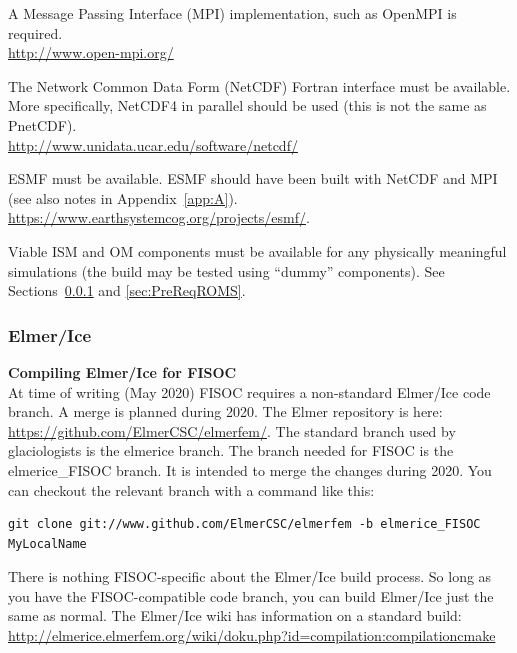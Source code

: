 \documentclass[11pt]{article}
\begin{document}
A Message Passing Interface (MPI) implementation, such as 
OpenMPI is required.\\
 \url{http://www.open-mpi.org/}

The Network Common Data Form (NetCDF) Fortran interface must be available. 
More specifically, NetCDF4 in parallel should be used (this is not the same as PnetCDF). \\
\url{http://www.unidata.ucar.edu/software/netcdf/}

ESMF must be available. ESMF should have been built with NetCDF and MPI 
(see also notes in Appendix~\ref{app:A}). \\
\url{https://www.earthsystemcog.org/projects/esmf/}.


Viable ISM and OM components must be available for any physically meaningful simulations
(the build may be tested using ``dummy'' components).  
See Sections~\ref{sec:PreReqElmer} and \ref{sec:PreReqROMS}.


\subsubsection{Elmer/Ice}
\label{sec:PreReqElmer}

\textbf{Compiling Elmer/Ice for FISOC} \\
At time of writing (May 2020) FISOC requires a non-standard Elmer/Ice 
code branch. A merge is planned during 2020.
The Elmer repository is here:
\url{https://github.com/ElmerCSC/elmerfem/}.
The standard branch used by glaciologists is the elmerice branch. 
The branch needed for FISOC is the elmerice\_FISOC branch. 
It is intended to merge the changes during 2020.
You can checkout the relevant branch with a command like this:
\begin{lstlisting}
git clone git://www.github.com/ElmerCSC/elmerfem -b elmerice_FISOC MyLocalName
\end{lstlisting}

There is nothing FISOC-specific about the Elmer/Ice build process.  
So long as you have the FISOC-compatible code branch, you can build Elmer/Ice 
just the same as normal. 
The Elmer/Ice wiki has information on a standard build:
\url{http://elmerice.elmerfem.org/wiki/doku.php?id=compilation:compilationcmake}
\end{document}
